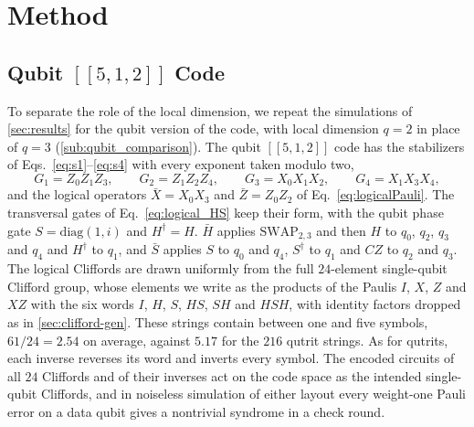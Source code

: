 \section{Method}\label{sec:method}






\subsection{Qubit \texorpdfstring{$[[5,1,2]]$}{[[5,1,2]]} Code}
\label{sub:qubit_code}

To separate the role of the local dimension, we repeat the simulations of \autoref{sec:results} for the qubit version of the code, with local dimension $q = 2$ in place of $q = 3$ (\autoref{sub:qubit_comparison}). The qubit $[[5,1,2]]$ code has the stabilizers of Eqs.~\eqref{eq:s1}--\eqref{eq:s4} with every exponent taken modulo two,
\begin{equation}
  G_1 = Z_0 Z_1 Z_3, \qquad G_2 = Z_1 Z_2 Z_4, \qquad G_3 = X_0 X_1 X_2, \qquad G_4 = X_1 X_3 X_4,
\end{equation}
and the logical operators $\bar X = X_0 X_3$ and $\bar Z = Z_0 Z_2$ of Eq.~\eqref{eq:logicalPauli}. The transversal gates of Eq.~\eqref{eq:logical_HS} keep their form, with the qubit phase gate $S = \mathrm{diag}(1, i)$ and $H^\dagger = H$. $\bar H$ applies $\mathrm{SWAP}_{2,3}$ and then $H$ to $q_0$, $q_2$, $q_3$ and $q_4$ and $H^\dagger$ to $q_1$, and $\bar S$ applies $S$ to $q_0$ and $q_4$, $S^\dagger$ to $q_1$ and $CZ$ to $q_2$ and $q_3$. The logical Cliffords are drawn uniformly from the full $24$-element single-qubit Clifford group, whose elements we write as the products of the Paulis $I$, $X$, $Z$ and $XZ$ with the six words $I$, $H$, $S$, $HS$, $SH$ and $HSH$, with identity factors dropped as in \autoref{sec:clifford-gen}. These strings contain between one and five symbols, $61/24 = 2.54$ on average, against $5.17$ for the $216$ qutrit strings. As for qutrits, each inverse reverses its word and inverts every symbol. The encoded circuits of all $24$ Cliffords and of their inverses act on the code space as the intended single-qubit Cliffords, and in noiseless simulation of either layout every weight-one Pauli error on a data qubit gives a nontrivial syndrome in a check round.

